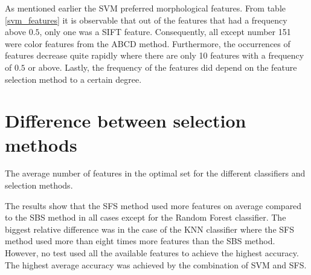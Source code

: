\documentclass{kththesis}
\begin{document}
As mentioned earlier the SVM preferred morphological features. From table \ref{svm_features} it is observable that out of the features that had a frequency above $0.5$, only one was a SIFT feature.  Consequently, all except number 151 were color features from the ABCD method. Furthermore, the occurrences of features decrease quite rapidly where there are only 10 features with a frequency of $0.5$ or above. Lastly, the frequency of the features did depend on the feature selection method to a certain degree.

\newpage

\section{Difference between selection methods}
 

\begin{table}[h!]
  \begin{center}
    \caption{The average number of features in the optimal set for the different classifiers and selection methods.}
  \end{center}
\end{table}

The results show that the SFS method used more features on average compared to the SBS method in all cases except for the Random Forest classifier. The biggest relative difference was in the case of the KNN classifier where the SFS method used more than eight times more features than the SBS method. However, no test used all the available features to achieve the highest accuracy. The highest average accuracy was achieved by the combination of SVM and SFS.

\newpage

\end{document}
